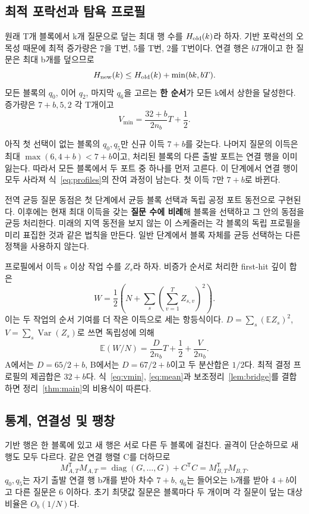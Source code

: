 \documentclass[11pt,a4paper]{article}
\theoremstyle{definition}
\theoremstyle{remark}\newtheorem{remark}[theorem]{주석}
\newcommand{\E}{\mathbb E}
\newcommand{\Var}{\operatorname{Var}}
\begin{document}
\subsection{최적 포락선과 탐욕 프로필}
원래 T개 블록에서 k개 질문으로 덮는 최대 행 수를 $H_{\rm old}(k)$라 하자. 기반 포락선의 오목성 때문에 최적 증가량은 7을 T번, 5를 T번, 2를 T번이다. 연결 행은 $bT$개이고 한 질문은 최대 b개를 덮으므로
\begin{equation}\label{eq:envelope}
 H_{\rm new}(k)\le H_{\rm old}(k)+\min(bk,bT).
\end{equation}
모든 블록의 $q_0$, 이어 $q_2$, 마지막 $q_6$을 고르는 \textbf{한 순서}가 모든 k에서 상한을 달성한다. 증가량은 $7+b,5,2$ 각 T개이고
\begin{equation}\label{eq:vmin} V_{\min}=\frac{32+b}{2n_b}T+\frac12.\end{equation}

아직 첫 선택이 없는 블록의 $q_0,q_5$만 신규 이득 $7+b$를 갖는다. 나머지 질문의 이득은 최대 $\max(6,4+b)<7+b$이고, 처리된 블록의 다른 출발 포트는 연결 행을 이미 잃는다. 따라서 모든 블록에서 두 포트 중 하나를 먼저 고른다. 이 단계에서 연결 행이 모두 사라져 식~\eqref{eq:profiles}의 잔여 과정이 남는다. 첫 이득 7만 $7+b$로 바뀐다.

전역 균등 질문 동점은 첫 단계에서 균등 블록 선택과 독립 공정 포트 동전으로 구현된다. 이후에는 현재 최대 이득을 갖는 \textbf{질문 수에 비례}해 블록을 선택하고 그 안의 동점을 균등 처리한다. 미래의 지역 동전을 보지 않는 이 스케줄러는 각 블록의 독립 프로필을 미리 표집한 것과 같은 법칙을 만든다. 일반 단계에서 블록 자체를 균등 선택하는 다른 정책을 사용하지 않는다.

프로필에서 이득 s 이상 작업 수를 $Z_s$라 하자. 비증가 순서로 처리한 first-hit 깊이 합은
\begin{equation}\label{eq:square}
 W=\frac12\left(N+\sum_s\left(\sum_{v=1}^T Z_{s,v}\right)^2\right).
\end{equation}
이는 두 작업의 순서 기여를 더 작은 이득으로 세는 항등식이다. $D=\sum_s(\E Z_s)^2$, $V=\sum_s\Var(Z_s)$로 쓰면 독립성에 의해
\begin{equation}\label{eq:mean}
 \E(W/N)=\frac{D}{2n_b}T+\frac12+\frac{V}{2n_b}.
\end{equation}
A에서는 $D=65/2+b$, B에서는 $D=67/2+b$이고 두 분산합은 $1/2$다. 최적 결정 프로필의 제곱합은 $32+b$다. 식~\eqref{eq:vmin}, \eqref{eq:mean}과 보조정리~\ref{lem:bridge}를 결합하면 정리~\ref{thm:main}의 비용식이 따른다.

\subsection{통계, 연결성 및 팽창}
기반 행은 한 블록에 있고 새 행은 서로 다른 두 블록에 걸친다. 골격이 단순하므로 새 행도 모두 다르다. 같은 연결 행렬 C를 더하므로
\begin{equation}
 M_{A,T}^{\mathsf T}M_{A,T}=\operatorname{diag}(G,\ldots,G)+C^{\mathsf T}C=M_{B,T}^{\mathsf T}M_{B,T}.
\end{equation}
$q_0,q_5$는 자기 출발 연결 행 b개를 받아 차수 $7+b$, $q_6$는 들어오는 b개를 받아 $4+b$이고 다른 질문은 6 이하다. 초기 최댓값 질문은 블록마다 두 개이며 각 질문이 덮는 대상 비율은 $O_b(1/N)$다.
\end{document}
